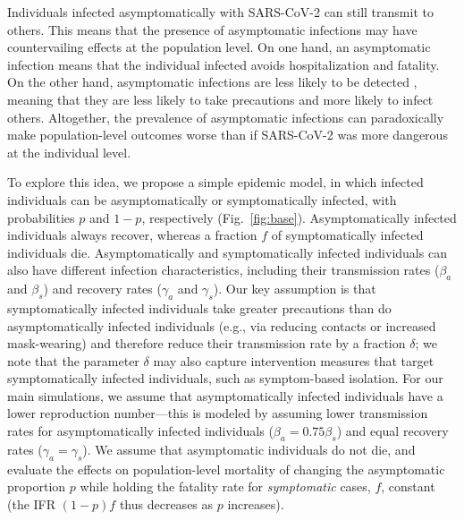 \documentclass[12pt]{article}
\newcommand{\fref}[1]{Fig.~\ref{fig:#1}}
\begin{document}
Individuals infected asymptomatically with SARS-CoV-2 can still transmit to others. 
This means that the presence of asymptomatic infections may have countervailing effects at the population level. 
On one hand, an asymptomatic infection means that the individual infected avoids hospitalization and fatality. 
On the other hand, asymptomatic infections are less likely to be detected \citep{fraser2004factors}, meaning that they are less likely to take precautions and more likely to infect others.
Altogether, the prevalence of asymptomatic infections can paradoxically make population-level outcomes worse than if SARS-CoV-2 was more dangerous at the individual level.

To explore this idea, we propose a simple epidemic model,
in which infected individuals can be asymptomatically or symptomatically infected, with probabilities $p$ and $1-p$, respectively (\fref{base}).  
Asymptomatically infected individuals always recover, whereas a fraction $f$ of symptomatically infected individuals die.
Asymptomatically and symptomatically infected individuals can also have different infection characteristics, including their transmission rates ($\beta_a$ and $\beta_s$) and recovery rates ($\gamma_a$ and $\gamma_s$).
Our key assumption is that symptomatically infected individuals take greater precautions than do asymptomatically infected individuals (e.g., via reducing contacts or increased mask-wearing) and therefore reduce their transmission rate by a fraction $\delta$;
we note that the parameter $\delta$ may also capture intervention measures that target symptomatically infected individuals, such as symptom-based isolation. 
For our main simulations, we assume that asymptomatically infected individuals have a lower reproduction number---this is modeled by assuming lower transmission rates for asymptomatically infected individuals ($\beta_a = 0.75 \beta_s$) and equal recovery rates ($\gamma_a = \gamma_s$).
We assume that asymptomatic individuals do not die, and evaluate the effects on population-level mortality of changing the asymptomatic proportion $p$ while holding the fatality rate for \emph{symptomatic} cases, $f$, constant (the IFR $(1-p)f$ thus decreases as $p$ increases).
\end{document}

